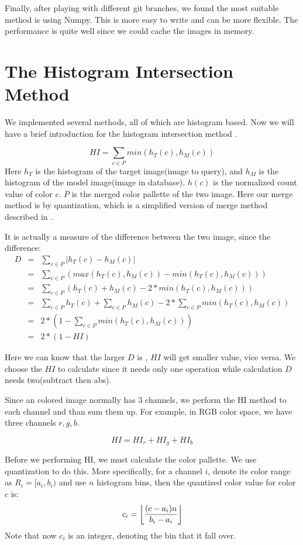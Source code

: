 \documentclass[11pt,a4paper]{article}
\DeclarePairedDelimiter\floor{\lfloor}{\rfloor}
\begin{document}
Finally, after playing with different git branches, we found the most suitable method is using Numpy.
This is more easy to write and can be more flexible. The performance is quite well since we could cache the
images in memory.

\section{The Histogram Intersection Method}
We implemented several methods, all of which are histogram based. Now we will have a brief introduction for the histogram intersection method \cite{HI}.

\[
    HI = \sum_{c \in P} min(h_T(c), h_M(c))
\]
Here $h_T$ is the histogram of the target image(image to query), and $h_M$ is the histogram of the model image(image in database).
$h(c)$ is the normalized count value of color $c$.  $P$ is the merged color pallette \cite{MEHI} of the two image. Here our merge method is
by quantization, which is a simplified version of merge method described in \cite{MEHI}.

It is actually a measure of the difference between the two image, since the difference:
\begin{eqnarray*}
    D & = & \sum_{c \in P} |h_T(c) - h_M(c)| \\
      & = & \sum_{c \in P} (max(h_T(c), h_M(c)) - min(h_T(c), h_M(c))) \\
      & = & \sum_{c \in P} (h_T(c) + h_M(c) - 2 * min(h_T(c), h_M(c)))\\
      & = & \sum_{c \in P} h_T(c) + \sum_{c \in P}h_M(c) - 2 * \sum_{c \in P} min(h_T(c), h_M(c)) \\
      & = & 2 * (1 - \sum_{c \in P} min(h_T(c), h_M(c))) \\
      & = & 2 * (1 - HI)
\end{eqnarray*}

Here we can know that the larger $D$ is , $HI$ will get smaller value, vice versa. We choose the $HI$ to calculate since it
needs only one operation while calculation $D$ needs two(subtract then abs).

Since an colored image normally has 3 channels, we perform the HI method to each channel and than sum them up.
For example, in RGB color space, we have three channels $r, g, b$.

\[
    HI = HI_r + HI_g + HI_b
\]

Before we performing HI, we must calculate the color pallette. We use quantization to do this. More specifically,
for a channel $i$, denote its color range as $R_i = [a_i, b_i)$ and use $n$ histogram bins, then the quantized color value 
for color $c$ is:
\[
c_i = \floor*{\frac{(c - a_i) n }{b_i - a_i}}
\]
Note that now $c_i$ is an integer, denoting the bin that it fall over.
\end{document}

